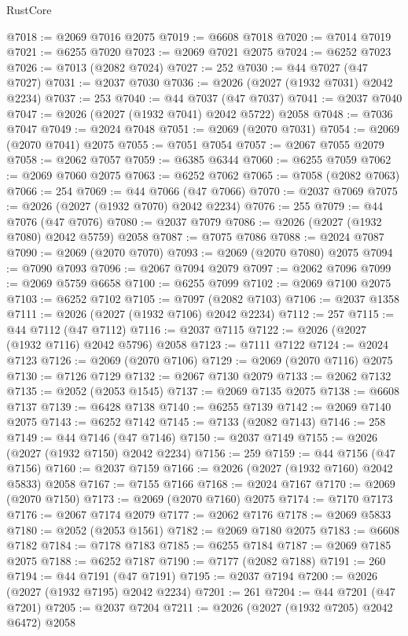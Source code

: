 \begin{lexlean}{RustCore}
\begin{coremodule}
@7018 := @2069 @7016 @2075
@7019 := @6608 @7018
@7020 := @7014 @7019
@7021 := @6255 @7020
@7023 := @2069 @7021 @2075
@7024 := @6252 @7023
@7026 := @7013 (@2082 @7024)
@7027 := 252
@7030 := @44 @7027 (@47 @7027)
@7031 := @2037 @7030
@7036 := @2026 (@2027 (@1932 @7031) @2042 @2234)
@7037 := 253
@7040 := @44 @7037 (@47 @7037)
@7041 := @2037 @7040
@7047 := @2026 (@2027 (@1932 @7041) @2042 @5722) @2058
@7048 := @7036 @7047
@7049 := @2024 @7048
@7051 := @2069 (@2070 @7031)
@7054 := @2069 (@2070 @7041) @2075
@7055 := @7051 @7054
@7057 := @2067 @7055 @2079
@7058 := @2062 @7057
@7059 := @6385 @6344
@7060 := @6255 @7059
@7062 := @2069 @7060 @2075
@7063 := @6252 @7062
@7065 := @7058 (@2082 @7063)
@7066 := 254
@7069 := @44 @7066 (@47 @7066)
@7070 := @2037 @7069
@7075 := @2026 (@2027 (@1932 @7070) @2042 @2234)
@7076 := 255
@7079 := @44 @7076 (@47 @7076)
@7080 := @2037 @7079
@7086 := @2026 (@2027 (@1932 @7080) @2042 @5759) @2058
@7087 := @7075 @7086
@7088 := @2024 @7087
@7090 := @2069 (@2070 @7070)
@7093 := @2069 (@2070 @7080) @2075
@7094 := @7090 @7093
@7096 := @2067 @7094 @2079
@7097 := @2062 @7096
@7099 := @2069 @5759 @6658
@7100 := @6255 @7099
@7102 := @2069 @7100 @2075
@7103 := @6252 @7102
@7105 := @7097 (@2082 @7103)
@7106 := @2037 @1358
@7111 := @2026 (@2027 (@1932 @7106) @2042 @2234)
@7112 := 257
@7115 := @44 @7112 (@47 @7112)
@7116 := @2037 @7115
@7122 := @2026 (@2027 (@1932 @7116) @2042 @5796) @2058
@7123 := @7111 @7122
@7124 := @2024 @7123
@7126 := @2069 (@2070 @7106)
@7129 := @2069 (@2070 @7116) @2075
@7130 := @7126 @7129
@7132 := @2067 @7130 @2079
@7133 := @2062 @7132
@7135 := @2052 (@2053 @1545)
@7137 := @2069 @7135 @2075
@7138 := @6608 @7137
@7139 := @6428 @7138
@7140 := @6255 @7139
@7142 := @2069 @7140 @2075
@7143 := @6252 @7142
@7145 := @7133 (@2082 @7143)
@7146 := 258
@7149 := @44 @7146 (@47 @7146)
@7150 := @2037 @7149
@7155 := @2026 (@2027 (@1932 @7150) @2042 @2234)
@7156 := 259
@7159 := @44 @7156 (@47 @7156)
@7160 := @2037 @7159
@7166 := @2026 (@2027 (@1932 @7160) @2042 @5833) @2058
@7167 := @7155 @7166
@7168 := @2024 @7167
@7170 := @2069 (@2070 @7150)
@7173 := @2069 (@2070 @7160) @2075
@7174 := @7170 @7173
@7176 := @2067 @7174 @2079
@7177 := @2062 @7176
@7178 := @2069 @5833
@7180 := @2052 (@2053 @1561)
@7182 := @2069 @7180 @2075
@7183 := @6608 @7182
@7184 := @7178 @7183
@7185 := @6255 @7184
@7187 := @2069 @7185 @2075
@7188 := @6252 @7187
@7190 := @7177 (@2082 @7188)
@7191 := 260
@7194 := @44 @7191 (@47 @7191)
@7195 := @2037 @7194
@7200 := @2026 (@2027 (@1932 @7195) @2042 @2234)
@7201 := 261
@7204 := @44 @7201 (@47 @7201)
@7205 := @2037 @7204
@7211 := @2026 (@2027 (@1932 @7205) @2042 @6472) @2058

\end{coremodule}
\end{lexlean}
